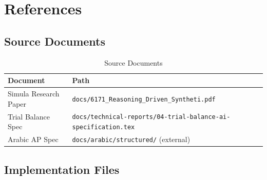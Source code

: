 \chapter{References}
\label{chap:references}

\section{Source Documents}

\begin{table}[H]
\centering
\caption{Source Documents}
\begin{tabularx}{\textwidth}{lX}
\toprule
\textbf{Document} & \textbf{Path} \\
\midrule
Simula Research Paper & \texttt{docs/6171\_Reasoning\_Driven\_Syntheti.pdf} \\
Trial Balance Spec & \texttt{docs/technical-reports/04-trial-balance-ai-specification.tex} \\
Arabic AP Spec & \texttt{docs/arabic/structured/} (external) \\
\bottomrule
\end{tabularx}
\end{table}

\section{Implementation Files}

